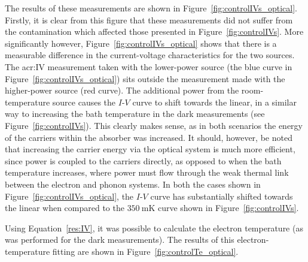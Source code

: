 \par 
The results of these measurements are shown in Figure~\ref{fig:controlIVs_optical}. Firstly, it is clear from this figure that these measurements did not suffer from the contamination which affected those presented in Figure~\ref{fig:controlIVs}. More significantly however, Figure~\ref{fig:controlIVs_optical} shows that there is a measurable difference in the current-voltage characteristics for the two sources. The \gls{acr:IV} measurement taken with the lower-power source (the blue curve in Figure~\ref{fig:controlIVs_optical}) sits outside the measurement made with the higher-power source (red curve). The additional power from the room-temperature source causes the $I$-$V$ curve to shift towards the linear, in a similar way to increasing the bath temperature in the dark measurements (see Figure~\ref{fig:controlIVs}). This clearly makes sense, as in both scenarios the energy of the carriers within the absorber was increased. It should, however, be noted that increasing the carrier energy via the optical system is much more efficient, since power is coupled to the carriers directly, as opposed to when the bath temperature increases, where power must flow through the weak thermal link between the electron and phonon systems. In both the cases shown in Figure~\ref{fig:controlIVs_optical}, the $I$-$V$ curve has substantially shifted towards the linear when compared to the $350~\mathrm{mK}$ curve shown in Figure~\ref{fig:controlIVs}.
\par 
Using Equation~\ref{res:IV}, it was possible to calculate the electron temperature (as was performed for the dark measurements). The results of this electron-temperature fitting are shown in Figure~\ref{fig:controlTe_optical}.
